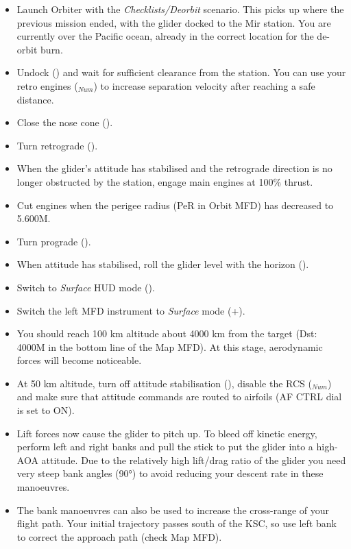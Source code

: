 \documentclass[Orbiter User Manual.tex]{subfiles}
\begin{document}
\begin{itemize}
\item Launch Orbiter with the \textit{Checklists/Deorbit} scenario. This picks up where the previous mission ended, with the glider docked to the Mir station. You are currently over the Pacific ocean, already in the correct location for the de-orbit burn.
\item Undock (\Ctrl{}) and wait for sufficient clearance from the station. You can use your retro engines (\keystroke{-}$_{Num}$) to increase separation velocity after reaching a safe distance.
\item Close the nose cone ().
\item Turn retrograde (\keystroke{]}).
\item When the glider's attitude has stabilised and the retrograde direction is no longer obstructed by the station, engage main engines at 100\% thrust.
\item Cut engines when the perigee radius (PeR in Orbit MFD) has decreased to 5.600M.
\item Turn prograde (\keystroke{[}).
\item When attitude has stabilised, roll the glider level with the horizon ().
\item Switch to \textit{Surface} HUD mode ().
\item Switch the left MFD instrument to \textit{Surface} mode (\Shift{}+\Shift{}).
\item You should reach 100 km altitude about 4000 km from the target (Dst: 4000M in the bottom line of the Map MFD). At this stage, aerodynamic forces will become noticeable.
\item At 50 km altitude, turn off attitude stabilisation (), disable the RCS (\keystroke{/}$_{Num}$) and make sure that attitude commands are routed to airfoils (AF CTRL dial is set to ON).
\item Lift forces now cause the glider to pitch up. To bleed off kinetic energy, perform left and right banks and pull the stick to put the glider into a high-AOA attitude. Due to the relatively high lift/drag ratio of the glider you need very steep bank angles (90°) to avoid reducing your descent rate in these manoeuvres.
\item The bank manoeuvres can also be used to increase the cross-range of your flight path. Your initial trajectory passes south of the KSC, so use left bank to correct the approach path (check Map MFD).

\end{itemize}
\end{document}
